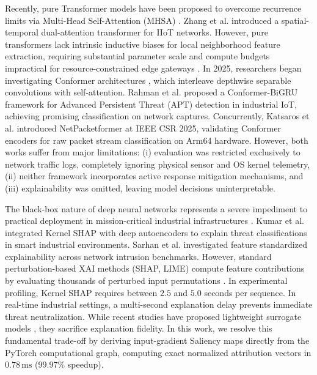 \documentclass[11pt,a4paper]{article}
\begin{document}
Recently, pure Transformer models have been proposed to overcome recurrence limits via Multi-Head Self-Attention (MHSA) \cite{zhang2024transformer_ids}. Zhang et al. \cite{zhang2024transformer_ids} introduced a spatial-temporal dual-attention transformer for IIoT networks. However, pure transformers lack intrinsic inductive biases for local neighborhood feature extraction, requiring substantial parameter scale and compute budgets impractical for resource-constrained edge gateways \cite{alsamhi2024green_ai}. In 2025, researchers began investigating Conformer architectures \cite{gulati2020conformer}, which interleave depthwise separable convolutions with self-attention. Rahman et al. \cite{conformer_bigru_ajse2025} proposed a Conformer-BiGRU framework for Advanced Persistent Threat (APT) detection in industrial IoT, achieving promising classification on network captures. Concurrently, Katsaros et al. \cite{netpacketformer2025} introduced NetPacketformer at IEEE CSR 2025, validating Conformer encoders for raw packet stream classification on Arm64 hardware. However, both works suffer from major limitations: (i) evaluation was restricted exclusively to network traffic logs, completely ignoring physical sensor and OS kernel telemetry, (ii) neither framework incorporates active response mitigation mechanisms, and (iii) explainability was omitted, leaving model decisions uninterpretable.

The black-box nature of deep neural networks represents a severe impediment to practical deployment in mission-critical industrial infrastructures \cite{kumar2023explainable_iiot, hussain2024adversarial_xai}. Kumar et al. \cite{kumar2023explainable_iiot} integrated Kernel SHAP with deep autoencoders to explain threat classifications in smart industrial environments. Sarhan et al. \cite{sarhan2023feature_explainability} investigated feature standardized explainability across network intrusion benchmarks. However, standard perturbation-based XAI methods (SHAP, LIME) compute feature contributions by evaluating thousands of perturbed input permutations \cite{lundberg2017shap}. In experimental profiling, Kernel SHAP requires between $2.5$ and $5.0$ seconds per sequence. In real-time industrial settings, a multi-second explanation delay prevents immediate threat neutralization. While recent studies have proposed lightweight surrogate models \cite{islam2025fast_xai_edge}, they sacrifice explanation fidelity. In this work, we resolve this fundamental trade-off by deriving input-gradient Saliency maps \cite{simonyan2013saliency, sundararajan2017integrated} directly from the PyTorch computational graph, computing exact normalized attribution vectors in $0.78\,\text{ms}$ ($99.97\%$ speedup).
\end{document}

